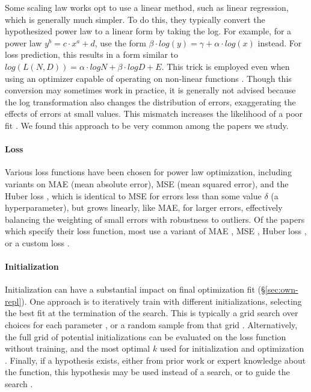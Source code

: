 Some scaling law works \citep{rosenfeld2019constructive} opt to use a linear method, such as linear regression, which is generally much simpler. To do this, they typically convert the hypothesized power law to a linear form by taking the log. For example, for a power law $y^b = c \cdot x^a + d$, use the form $\beta \cdot log(y) = \gamma + \alpha \cdot log(x)$ instead. For loss prediction, this results in a form similar to $log(L(N, D)) = \alpha \cdot logN + \beta \cdot logD + E$. This trick is employed even when using an optimizer capable of operating on non-linear functions \citep{hashimoto2021model}. Though this conversion may sometimes work in practice, it is generally not advised because the log transformation also changes the distribution of errors, exaggerating the effects of errors at small values. This mismatch increases the likelihood of a poor fit \citep{goldstein2004problems}. We found this approach to be very common among the papers we study.


\paragraph{Loss}
Various loss functions have been chosen for power law optimization, including variants on MAE (mean absolute error), MSE (mean squared error), and the Huber loss \citep{huber1992robust}, which is identical to MSE for errors less than some value $\delta$ (a hyperparameter), but grows linearly, like MAE, for larger errors, effectively balancing the weighting of small errors with robustness to outliers. Of the papers which specify their loss function, most use a variant of MAE \citep{ghorbani2021scaling}, MSE \citep{goyal2024scaling,hilton2023scaling}, Huber loss \citep{hoffmann2022training,aghajanyan2023scaling,frantar2023scaling,tao2024scaling,muennighoff2024scaling}, or a custom loss \citep{covert2024scaling}. %

\paragraph{Initialization}

Initialization can have a substantial impact on final optimization fit (\S\ref{sec:own-repl}). One approach is to iteratively train with different initializations, selecting the best fit at the termination of the search. This is typically a grid search over choices for each parameter \citep{aghajanyan2023scaling,muennighoff2024scaling}, or a random sample from that grid \citep{frantar2023scaling,tao2024scaling}. Alternatively, the full grid of potential initializations can be evaluated on the loss function without training, and the most optimal $k$ used for initialization and optimization \citep{caballero2022broken}. Finally, if a hypothesis exists, either from prior work or expert knowledge about the function, this hypothesis may be used instead of a search, or to guide the search \citep{besiroglu2024chinchilla}.


